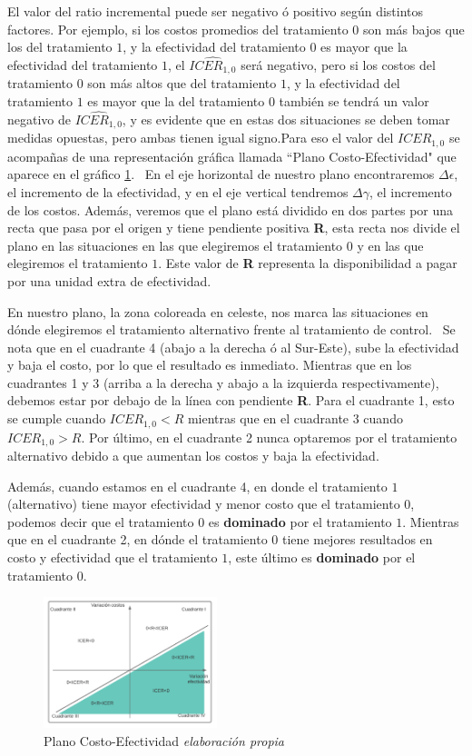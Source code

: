 \documentclass{siep}
\begin{document}
El valor del ratio incremental puede ser negativo ó positivo según distintos factores. Por ejemplo, si los costos promedios del tratamiento $0$ son más bajos que los del tratamiento $1$, y la efectividad del tratamiento $0$ es mayor que la efectividad del tratamiento $1$, el $\widehat{ICER_{1,0}}$ será negativo, pero si los costos del tratamiento $0$ son más altos que del tratamiento $1$, y la efectividad del tratamiento $1$ es mayor que la del tratamiento $0$ también se tendr\'a un valor negativo de $\widehat{ICER_{1,0}}$, y es evidente que en estas dos situaciones se deben tomar medidas opuestas, pero ambas tienen igual signo.Para eso el valor del $ICER_{1,0}$ se acompañas de una representación gráfica llamada ``Plano Costo-Efectividad" que aparece  en el gráfico \ref{fig:1}.
\
En el eje horizontal de nuestro plano encontraremos $\Delta\epsilon$, el incremento de la efectividad, y en el eje vertical tendremos $\Delta\gamma$, el incremento de los costos. Además, veremos que el plano está dividido en dos partes por una recta que pasa por el origen y tiene pendiente positiva \textbf{R}, esta recta nos divide el plano en las situaciones en las que elegiremos el tratamiento $0$ y en las que elegiremos el tratamiento $1$. Este valor de \textbf{R} representa la disponibilidad a pagar por una unidad extra de efectividad.

En nuestro plano, la zona coloreada en celeste, nos marca las situaciones en dónde elegiremos el tratamiento alternativo frente al tratamiento de control.
\
Se nota que en el cuadrante 4 (abajo a la derecha ó al Sur-Este), sube la efectividad y baja el costo, por lo que el resultado es inmediato. Mientras que en los cuadrantes 1 y 3 (arriba a la derecha y abajo a la izquierda respectivamente), debemos estar por debajo de la línea con pendiente \textbf{R}. Para el cuadrante 1, esto se cumple cuando $ICER_{1,0}<R$ mientras que en el cuadrante 3 cuando $ICER_{1,0}>R$. Por último, en el cuadrante 2 nunca optaremos por el tratamiento alternativo debido a que aumentan los costos y baja la efectividad.\

Además, cuando estamos en el cuadrante 4, en donde el tratamiento $1$ (alternativo) tiene mayor efectividad y menor costo que el tratamiento $0$, podemos decir que el tratamiento $0$ es \textbf{dominado} por el tratamiento $1$. Mientras que en el cuadrante 2, en dónde el tratamiento $0$ tiene mejores resultados en costo y efectividad que el tratamiento $1$, este último es \textbf{dominado} por el tratamiento $0$.

\begin{figure}[htbp]
	\centering
	\includegraphics[width=0.45\textwidth]{grafi/Plano_Costo_elab_propia.png}
	\caption{Plano Costo-Efectividad \textit{elaboración propia}}
	\label{fig:1}
\end{figure}
\end{document}
